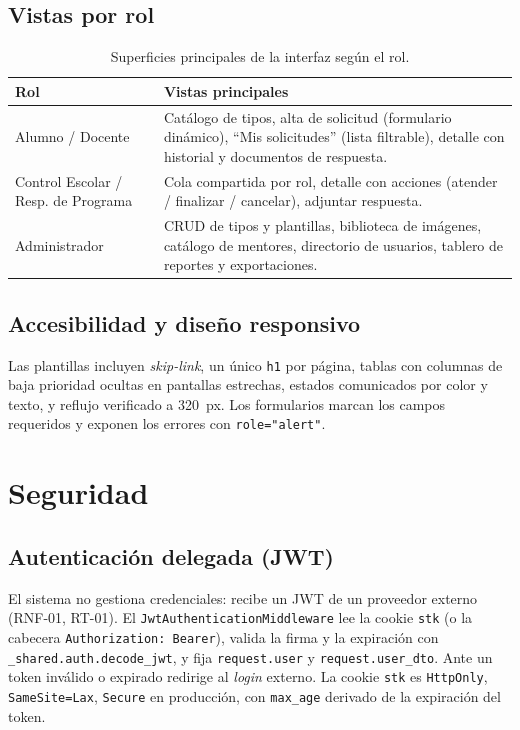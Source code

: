 \documentclass[12pt,letterpaper]{report}
\begin{document}
\section{Vistas por rol}

\begin{table}[H]
\centering
\caption{Superficies principales de la interfaz según el rol.}
\begin{tabularx}{\textwidth}{L{3.4cm} X}
\toprule
\textbf{Rol} & \textbf{Vistas principales} \\
\midrule
Alumno / Docente & Catálogo de tipos, alta de solicitud (formulario dinámico),
``Mis solicitudes'' (lista filtrable), detalle con historial y documentos de
respuesta. \\
Control Escolar / Resp. de Programa & Cola compartida por rol, detalle con
acciones (atender / finalizar / cancelar), adjuntar respuesta. \\
Administrador & CRUD de tipos y plantillas, biblioteca de imágenes, catálogo de
mentores, directorio de usuarios, tablero de reportes y exportaciones. \\
\bottomrule
\end{tabularx}
\end{table}

\section{Accesibilidad y diseño responsivo}

Las plantillas incluyen \textit{skip-link}, un único \texttt{h1} por página,
tablas con columnas de baja prioridad ocultas en pantallas estrechas, estados
comunicados por color y texto, y reflujo verificado a 320~px. Los formularios
marcan los campos requeridos y exponen los errores con \texttt{role="alert"}.

\chapter{Seguridad}

\section{Autenticación delegada (JWT)}

El sistema no gestiona credenciales: recibe un JWT de un proveedor externo
(RNF-01, RT-01). El \texttt{JwtAuthenticationMiddleware} lee la cookie
\texttt{stk} (o la cabecera \texttt{Authorization: Bearer}), valida la firma y la
expiración con \texttt{\_shared.auth.decode\_jwt}, y fija \texttt{request.user} y
\texttt{request.user\_dto}. Ante un token inválido o expirado redirige al
\textit{login} externo. La cookie \texttt{stk} es \texttt{HttpOnly},
\texttt{SameSite=Lax}, \texttt{Secure} en producción, con \texttt{max\_age}
derivado de la expiración del token.
\end{document}
